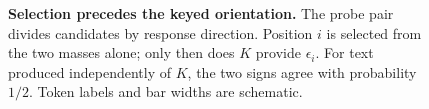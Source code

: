 \begin{figure}[tb]
{
}%
\caption{\textbf{Selection precedes the keyed orientation.}
The probe pair divides candidates by response direction. Position $i$ is selected from the two
masses alone; only then does $K$ provide $\epsilon_i$. For text produced independently of $K$,
the two signs agree with probability $1/2$. Token labels and bar widths are schematic.}
\label{fig:blindadmission}
\end{figure}

